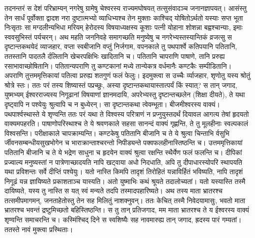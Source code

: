 \adhyAya
\vspace{25pt}
\vakya तदनन्तरं स देशं परिभ्राम्यन् नगरेषु ग्रामेषु चेश्वरस्य राज्यमघोषयत् तत्सुसंवादञ्च जनानज्ञापयत्।
\vakya आसंस्तु तेन सार्धं पूर्वोक्ता द्वादश नरा दुष्टात्मभ्यो व्याधिभ्यश्च तेन मुक्ताः काश्चिद् योषितोऽर्थतो यस्याः सप्त भूता निःसृताः सा मग्दलीन्यभिधा मरियम्
\vakya हेरोदस्य विषयाध्यक्षस्य कूशाः पत्नी योहाना शोशन्ना बह्वश्चान्याः, इमाः स्ववसुभिस्तं पर्यचरन्।
\vakya अथ महति जननिवहे समागच्छति मनुष्येषु च नगरेभ्यस्तस्यान्तिकं व्रजत्सु स दृष्टान्तकथयेदं व्याजहार,
\vakya वप्ता स्वबीजानि वप्तुं निर्जगाम, वपनकाले तु पथपार्श्वे कतिपयानि पतितानि, ततस्तानि पादतलै र्दलितानि खेचरपक्षिभिः खादितानि च।
\vakya पतितानि चापराणि पाषाणे, तानि प्ररुह्य रसाभावाच्छोषितानि।
\vakya पतितान्यपराणि तु कण्टकानां मध्ये तान्येकत्र वर्धमानैः कण्टकैः सम्पीडितानि।
\vakya अपराणि तुत्तममृत्तिकायां पतित्वा प्ररुह्य शतगुणं फलं फेलुः। इदमुक्त्वा स उच्चैः र्व्याजहार, शृणोतु यस्य श्रोतुं श्रोत्रे स्तः।
\vakya ततः परं तस्य शिष्यास्तं पप्रच्छुः, अस्या दृष्टान्तकथायास्तात्पर्यं किं स्यात्?
\vakya स तान् जगाद, युष्मभ्यम् ईश्वरराज्यस्य निगूढानां विषयाणां ज्ञानमदायि, अपरेभ्यस्तु दृष्टान्तच्छलेन (शिक्षा दीयते), ते यथा दृष्ट्वापि न पश्येयुः श्रुत्वापि च न बुध्येरन्।
\vakya सा दृष्टान्तकथा त्वेवम्भूता। बीजमीश्वरस्य वाक्यं।
\vakya पथपार्श्वस्थास्ते ये शृण्वन्ति ततः परं यथा ते विश्वस्य परित्राणं न प्रप्नुयुस्तदर्थं दियावल आगत्य तेषां हृदयतो वाक्यमपहरति।
\vakya पाषाणोपरिस्थाश्च ते ये श्रवणकाले सहसा सानन्दं वाक्यं गृह्णन्ति, ते तु मूलहीनाः स्वल्पकालं विश्वसन्ति। परीक्षाकाले चापक्राम्यन्ति।
\vakya कण्टकेषु पतितानि बीजानि च ते ये श्रुत्वा चिन्ताभि र्वसुभि र्जीवनसम्बन्धीयसुखभोगेन च भाराक्रान्ताश्चरन्तो निपीड्यन्ते पक्वफलहीनास्तिष्ठन्ति च।
\vakya उत्तममृत्तिकायां पतितानि बीजानि च ते ये भद्रेण साधुना च हृदयेन वाक्यं श्रुत्वा रक्षन्ति स्थैर्येण फलं फलन्ति च।
\vakya दीपिकां प्रज्वाल्य मनुष्यस्तां न पात्रेणाच्छादयति नापि खट्वाया अधो निदधाति, अपि तु दीपाधारस्योपरि स्थापयति यथा प्रविशन्तः सर्वे दीप्तिं पश्येयुः।
\vakya यतो नास्ति किमपि तादृशं तिरोहितं यन्नाविर्हितं भविष्यति, नापि तादृशं निगूढं यन्न ज्ञायिष्यते प्रकाशताञ्च यास्यति।
\vakya अतो युष्माभिः कथं श्रूयते तदालोच्यतां। यतो यस्यास्ति तस्मै दायिष्यते, यस्य तु नास्ति स यत् स्वं मन्यते तदपि तस्मादपहारिष्यते।
\vakya अथ तस्य माता भ्रातरश्च तत्समीपमागमन्, जनताहेतोस्तु तेन सह मिलितुं नाशक्नुवन्।
\vakya ततः केचित् तस्मै निवेदयामासुः, भवतो माता भ्रातरश्च भवन्तं द्रष्टुमिच्छतो बहिस्तिष्ठन्ति।
\vakya स तु तान् प्रतिजगाद, मम माता भ्रातरश्च ते य ईश्वरस्य वाक्यं शृण्वन्ति समाचरन्ति च।
\vakya कस्मिंश्चिद् दिने स स्वशिष्यैः सह नावमारुह्य तान् जगाद, ह्रदस्य पारं गम्यतां। ततस्ते नावं मुक्त्वा प्रस्थिताः।
